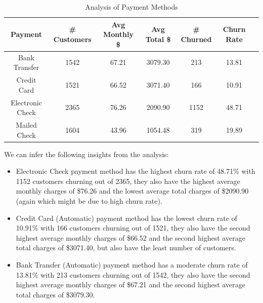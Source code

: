 \documentclass{article}
\theoremstyle{mytheoremstyle}
\theoremstyle{mytheoremstyle}
\theoremstyle{myproblemstyle}
\begin{document}
\begin{table}[H]
    \centering
    \begin{tabular}{|c|c|c|c|c|c|c|}
        \hline
        \textbf{Payment} & \textbf{\# Customers} & \textbf{Avg Monthly \$} & \textbf{Avg Total \$} & \textbf{\# Churned} & \textbf{Churn Rate} \\
        \hline
        Bank Transfer & 1542 & 67.21 & 3079.30 & 213 & 13.81 \\
        Credit Card & 1521 & 66.52 & 3071.40 & 166 & 10.91 \\
        Electronic Check & 2365 & 76.26 & 2090.90 & 1152 & 48.71 \\
        Mailed Check & 1604 & 43.96 & 1054.48 & 319 & 19.89 \\
        \hline
    \end{tabular}
    \caption{Analysis of Payment Methods}
\end{table}

We can infer the following insights from the analysis:

\begin{itemize}
    \item Electronic Check payment method has the highest churn rate of 48.71\% with 1152 customers churning out of 2365, they also have the highest average monthly charges of \$76.26 and the lowest average total charges of \$2090.90 (again which might be due to high churn rate).
    \item Credit Card (Automatic) payment method has the lowest churn rate of 10.91\% with 166 customers churning out of 1521, they also have the second highest average monthly charges of \$66.52 and the second highest average total charges of \$3071.40, but also have the least number of customers.
    \item Bank Transfer (Automatic) payment method has a moderate churn rate of 13.81\% with 213 customers churning out of 1542, they also have the second highest average monthly charges of \$67.21 and the second highest average total charges of \$3079.30.
\end{itemize}


\end{document}
